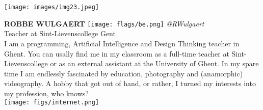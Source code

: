 \noindent
\begin{minipage}{0.3\textwidth}
\centering
\texttt{[image: images/img23.jpeg]}
\end{minipage}
\hfill
\begin{minipage}{0.6\textwidth}\raggedright
\color{color1}\uppercase{\textbf{Robbe Wulgaert}}
\color{color2}\hspace{0.2cm}\texttt{[image: flags/be.png]}
\hspace{0.2cm}\textit{@RWulgaert}
\\
Teacher at Sint-Lievenscollege Gent\\
{\footnotesize I am a programming, Artificial Intelligence and Design Thinking teacher in Ghent. You can usally find me in my classroom as a full-time teacher at Sint-Lievenscollege or as an external assistant at the University of Ghent. In my spare time I am endlessly fascinated by education, photography and (anamorphic) videography. A hobby that got out of hand, or rather, I turned my interests into my profession, who knows?}\\
\texttt{[image: figs/internet.png]}
\end{minipage}
\newline\newline\newline

